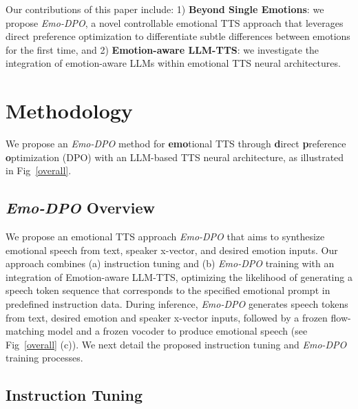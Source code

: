 \documentclass[conference]{IEEEtran}
\begin{document}
Our contributions of this paper include: 1) \textbf{Beyond Single Emotions}: we propose \textit{Emo-DPO}, a novel controllable emotional TTS approach that leverages direct preference optimization to differentiate subtle differences between emotions for the first time, and
2) \textbf{Emotion-aware LLM-TTS}: we investigate the integration of emotion-aware LLMs within emotional TTS neural architectures.


\section{Methodology}
\vspace{-0.1cm}
We propose an \textit{Emo-DPO} method for \textbf{emo}tional TTS through \textbf{d}irect \textbf{p}reference \textbf{o}ptimization (DPO) with an LLM-based TTS neural architecture, as illustrated in Fig~\ref{overall}. 


\vspace{-0.1cm}
\subsection{\textit{Emo-DPO} Overview}
\vspace{-0.1cm}
We propose an emotional TTS approach \textit{Emo-DPO} that aims to synthesize emotional speech from text, speaker x-vector, and desired emotion inputs. Our approach combines (a) instruction tuning and (b) \textit{Emo-DPO} training with an integration of Emotion-aware LLM-TTS, optimizing the likelihood of generating a speech token sequence that corresponds to the specified emotional prompt in predefined instruction data. During inference, \textit{Emo-DPO} generates speech tokens from text, desired emotion and speaker x-vector inputs, followed by a frozen flow-matching model and a frozen vocoder to produce emotional speech (see Fig~\ref{overall} (c)). We next detail the proposed instruction tuning and \textit{Emo-DPO} training processes.

\vspace{-0.1cm}
\subsection{Instruction Tuning}
\vspace{-0.1cm}
\end{document}
